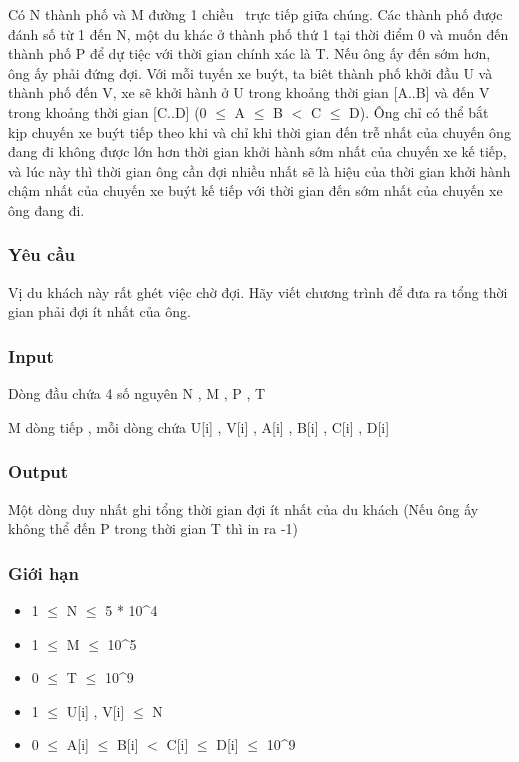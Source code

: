

Có N thành phố và M đường 1 chiều  trực tiếp giữa chúng. Các thành phố được đánh số từ 1 đến N, một du khác ở thành phố thứ 1 tại thời điểm 0 và muốn đến thành phố P để dự tiệc với thời gian chính xác là T. Nếu ông ấy đến sớm hơn, ông ấy phải đứng đợi. Với mỗi tuyến xe buýt, ta biêt thành phố khởi đầu U và thành phố đến V, xe sẽ khởi hành ở U trong khoảng thời gian [A..B] và đến V trong khoảng thời gian [C..D] (0  $\le$  A  $\le$  B $<$ C  $\le$  D). Ông chỉ có thể bắt kịp chuyến xe buýt tiếp theo khi và chỉ khi thời gian đến trễ nhất của chuyến ông đang đi không được lớn hơn thời gian khởi hành sớm nhất của chuyến xe kế tiếp, và lúc này thì thời gian ông cần đợi nhiều nhất sẽ là hiệu của thời gian khởi hành chậm nhất của chuyến xe buýt kế tiếp với thời gian đến sớm nhất của chuyến xe ông đang đi.

\subsubsection{Yêu cầu}

Vị du khách này rất ghét việc chờ đợi. Hãy viết chương trình để đưa ra tổng thời gian phải đợi ít nhất của ông.

\subsubsection{Input}

Dòng đầu chứa 4 số nguyên N , M , P , T

M dòng tiếp , mỗi dòng chứa U[i] , V[i] , A[i] , B[i] , C[i] , D[i]

\subsubsection{Output}

Một dòng duy nhất ghi tổng thời gian đợi ít nhất của du khách (Nếu ông ấy không thể đến P trong thời gian T thì in ra -1)

\subsubsection{Giới hạn}
\begin{itemize}
	\item 1  $\le$  N  $\le$  5 * 10\textasciicircum4
	\item 1  $\le$  M  $\le$  10\textasciicircum5
	\item 0  $\le$  T  $\le$  10\textasciicircum9
	\item 1  $\le$  U[i] , V[i]  $\le$  N
	\item 0  $\le$  A[i]  $\le$  B[i] $<$ C[i]  $\le$  D[i]  $\le$  10\textasciicircum9
\end{itemize}

